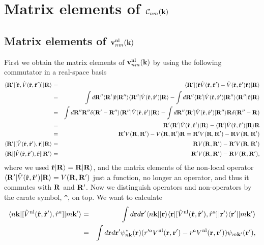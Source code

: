 \section{Matrix elements of $\calc_{nm}(\bfk)$}\label{calc}

\subsection{Matrix elements of $\bfv^\nl_{nm}(\bfk)$}

First we obtain the matrix elements of $\bfv^\nl_{nm}(\bfk)$ by using
the following commutator in a
real-space basis
\begin{eqnarray}\label{cn0}
\bra{\bfR'}[\hat\bfr,\hat V(\hat\bfr,\hat\bfr')]\ket{\bfR}
&=&
\bra{\bfR'}(\hat\bfr\hat V(\hat\bfr,\hat\bfr')
-
\hat V(\hat\bfr,\hat\bfr')\hat\bfr
)
\ket{\bfR}
\nonumber\\
&=&
\int d\bfR''\bra{\bfR'}\hat\bfr\ket{\bfR''}\bra{\bfR''}\hat V(\hat\bfr,\hat\bfr') \ket{\bfR}
-
\int d\bfR''\bra{\bfR'}\hat V(\hat\bfr,\hat\bfr')\ket{\bfR''}\bra{\bfR''}\hat\bfr\ket{\bfR}
\nonumber\\
&=&
\int d\bfR'' \bfR''\gd(\bfR'-\bfR'')
\bra{\bfR''}\hat V(\hat\bfr,\hat\bfr') \ket{\bfR}
-
\int d\bfR''\bra{\bfR'}\hat V(\hat\bfr,\hat\bfr')\ket{\bfR''}\bfR\gd(\bfR''-\bfR)
\nonumber\\
&=&
\bfR'\bra{\bfR'}\hat V(\hat\bfr,\hat\bfr') \ket{\bfR}
-
\bra{\bfR'}\hat V(\hat\bfr,\hat\bfr')\ket{\bfR}\bfR
\nonumber\\
&=&
\bfR'
V(\bfR,\bfR')
-
V(\bfR,\bfR')
\bfR
=
\bfR'
V(\bfR,\bfR')
-
\bfR
 V(\bfR,\bfR')
\nonumber\\
\bra{\bfR'}[\hat V(\hat\bfr,\hat\bfr'),\hat\bfr]\ket{\bfR}
&=&
\bfR
V(\bfR,\bfR')
-
\bfR'
 V(\bfR,\bfR')
\nonumber\\
\bra{\bfR}[\hat V(\hat\bfr,\hat\bfr'),\hat\bfr]\ket{\bfR'}
&=&
\bfR'
V(\bfR,\bfR')
-
\bfR
 V(\bfR,\bfR')
,
\end{eqnarray} 
where we used $\hat\bfr\ket{\bfR}=\bfR\ket{\bfR}$, and
the matrix elements of the non-local operator
$\bra{\bfR'}\hat V(\hat\bfr,\hat\bfr')\ket{\bfR}=V(\bfR,\bfR')$ just a
function, no longer an operator, and thus it commutes with $\bfR$ and $\bfR'$.
Now we distinguish operators and non-operators by the carate symbol,
\verb=^=, on top.
We want to calculate
\begin{eqnarray}\label{cn2}
\bra{n\bfk}[\hat V^\nl(\hat\bfr,\hat\bfr'),\hat r^a]\ket{m\bfk'}
&=&
\int d\bfr d\bfr'
\bra{n\bfk}
\ket{\bfr}\bra{\bfr}
[\hat V^\nl(\hat\bfr,\hat\bfr'),\hat r^a]
\ket{\bfr'}\bra{\bfr'}
\ket{m\bfk'}
\nonumber\\
&=&
\int d\bfr d\bfr'
\psi^*_{n\bfk}(\bfr)
(  
r'^a V^\nl(\bfr,\bfr')
-  
r^aV^\nl(\bfr,\bfr')
)
\psi_{m\bfk'}(\bfr')
,
\end{eqnarray}  
